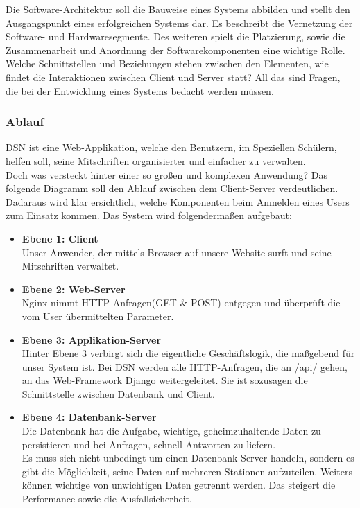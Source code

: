 
Die Software-Architektur soll die Bauweise eines Systems abbilden und stellt den Ausgangspunkt eines erfolgreichen Systems dar. Es beschreibt die Vernetzung der Software- und Hardwaresegmente. Des weiteren spielt die Platzierung, sowie die Zusammenarbeit und Anordnung der Softwarekomponenten eine wichtige Rolle.\\
Welche Schnittstellen und Beziehungen stehen zwischen den Elementen, wie findet die Interaktionen zwischen Client und Server statt? All das sind Fragen, die bei der Entwicklung eines Systems bedacht werden müssen. \cite{VERTEILTE_SYSTEME}

\subsubsection{Ablauf}
DSN ist eine Web-Applikation, welche den Benutzern, im Speziellen Schülern, helfen soll, seine Mitschriften organisierter und einfacher zu verwalten.\\
Doch was versteckt hinter einer so großen und komplexen Anwendung? Das folgende Diagramm soll den Ablauf zwischen dem Client-Server verdeutlichen. Dadaraus wird klar ersichtlich, welche Komponenten beim Anmelden eines Users zum Einsatz kommen. Das System wird folgendermaßen aufgebaut:
\begin{itemize}
\item \textbf{Ebene 1: Client}\\ Unser Anwender, der mittels Browser auf unsere Website surft und seine Mitschriften verwaltet.
\item \textbf{Ebene 2: Web-Server}\\ Nginx nimmt HTTP-Anfragen(GET \& POST) entgegen und überprüft die vom User übermittelten Parameter.
\item \textbf{Ebene 3: Applikation-Server}\\ Hinter Ebene 3 verbirgt sich die eigentliche Geschäftslogik, die maßgebend für unser System ist. Bei DSN werden alle HTTP-Anfragen, die an /api/ gehen, an das Web-Framework Django weitergeleitet. Sie ist sozusagen die Schnittstelle zwischen Datenbank und Client.
\item \textbf{Ebene 4: Datenbank-Server}\\ Die Datenbank hat die Aufgabe, wichtige, geheimzuhaltende Daten zu persistieren und bei Anfragen, schnell Antworten zu liefern.\\
Es muss sich nicht unbedingt um einen Datenbank-Server handeln, sondern es gibt die Möglichkeit, seine Daten auf mehreren Stationen aufzuteilen. Weiters können wichtige von unwichtigen Daten getrennt werden. Das steigert die Performance sowie die Ausfallsicherheit.
\end{itemize}

